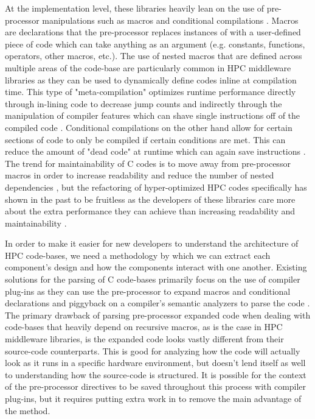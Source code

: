 At the implementation level, these libraries heavily lean on the use of pre-processor manipulations such as macros and conditional compilations \cite{ISO:2001:IICb}. Macros are declarations that the pre-processor replaces instances of with a user-defined piece of code which can take anything as an argument (e.g. constants, functions, operators, other macros, etc.). The use of nested macros that are defined across multiple areas of the code-base are particularly common in HPC middleware libraries as they can be used to dynamically define codes inline at compilation time. This type of "meta-compilation" optimizes runtime performance directly through in-lining code to decrease jump counts and indirectly through the manipulation of compiler features which can shave single instructions off of the compiled code \cite{optimized_c_survey}. Conditional compilations on the other hand allow for certain sections of code to only be compiled if certain conditions are met. This can reduce the amount of "dead code" at runtime which can again save instructions \cite{optimized_c_survey}. The trend for maintainability of C codes is to move away from pre-processor macros in order to increase readability and reduce the number of nested dependencies \cite{1311050}, but the refactoring of hyper-optimized HPC codes specifically has shown in the past to be fruitless as the developers of these libraries care more about the extra performance they can achieve than increasing readability and maintainability \cite{10.1145/1145319.1145328}.

In order to make it easier for new developers to understand the architecture of HPC code-bases, we need a methodology by which we can extract each component's design and how the components interact with one another. Existing solutions for the parsing of C code-bases primarily focus on the use of compiler plug-ins as they can use the pre-processor to expand macros and conditional declarations and piggyback on a compiler's semantic analyzers to parse the code \cite{Dudka2012-gm, sca_thesis, 10.1007/978-3-030-17872-7_6}. The primary drawback of parsing pre-processor expanded code when dealing with code-bases that heavily depend on recursive macros, as is the case in HPC middleware libraries, is the expanded code looks vastly different from their source-code counterparts. This is good for analyzing how the code will actually look as it runs in a specific hardware environment, but doesn’t lend itself as well to understanding how the source-code is structured. It is possible for the context of the pre-processor directives to be saved throughout this process with compiler plug-ins, but it requires putting extra work in to remove the main advantage of the method.

